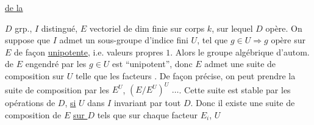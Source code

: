 
\uline{ de la }

$D$ grp., $I$  distingué, $E$ vectoriel de dim finie sur corps $k$, sur lequel $D$ opère. On suppose que $I$ admet un sous-groupe d'indice fini $U$,  tel que $g\in U\Rightarrow g$ opère sur $E$ de façon \uline{unipotente}, i.e. valeurs propres  $1$. Alors le groupe algébrique d'autom. de $E$ engendré par les $g\in U$ est ``unipotent'', donc  $E$ admet une suite de composition sur $U$ telle que les  facteurs . De façon précise, on peut prendre la suite de composition par les $E^U$, $(E/E^U)^U$ $\ldots$. Cette suite est stable par les opérations de $D$, \uline{si}    $U$ dans $I$ invariant par tout $D$. Donc il existe une suite de composition de $E$ \uline{sur $D$} tels que sur chaque facteur $E_i$,  $U$


